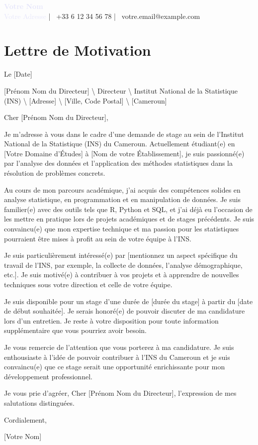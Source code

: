 \documentclass[
]{article}
\author{}
\date{\vspace{-2.5em}}
\begin{document}

\begin{center}
\textcolor{lavender}{\LARGE\textbf{Votre Nom}} \\
\textcolor{lavender}{Votre Adresse} | \faMobilePhone\ +33 6 12 34 56 78 | \faEnvelopeO\ votre.email@example.com \\
\end{center}

\hrulefill

\hypertarget{lettre-de-motivation}{%
\section{Lettre de Motivation}\label{lettre-de-motivation}}

Le {[}Date{]}

{[}Prénom Nom du Directeur{]} \textbackslash{} Directeur
\textbackslash{} Institut National de la Statistique (INS)
\textbackslash{} {[}Adresse{]} \textbackslash{} {[}Ville, Code Postal{]}
\textbackslash{} {[}Cameroun{]}

\hrulefill

Cher {[}Prénom Nom du Directeur{]},

Je m'adresse à vous dans le cadre d'une demande de stage au sein de
l'Institut National de la Statistique (INS) du Cameroun. Actuellement
étudiant(e) en {[}Votre Domaine d'Études{]} à {[}Nom de votre
Établissement{]}, je suis passionné(e) par l'analyse des données et
l'application des méthodes statistiques dans la résolution de problèmes
concrets.

Au cours de mon parcours académique, j'ai acquis des compétences solides
en analyse statistique, en programmation et en manipulation de données.
Je suis familier(e) avec des outils tels que R, Python et SQL, et j'ai
déjà eu l'occasion de les mettre en pratique lors de projets académiques
et de stages précédents. Je suis convaincu(e) que mon expertise
technique et ma passion pour les statistiques pourraient être mises à
profit au sein de votre équipe à l'INS.

Je suis particulièrement intéressé(e) par {[}mentionnez un aspect
spécifique du travail de l'INS, par exemple, la collecte de données,
l'analyse démographique, etc.{]}. Je suis motivé(e) à contribuer à vos
projets et à apprendre de nouvelles techniques sous votre direction et
celle de votre équipe.

Je suis disponible pour un stage d'une durée de {[}durée du stage{]} à
partir du {[}date de début souhaitée{]}. Je serais honoré(e) de pouvoir
discuter de ma candidature lors d'un entretien. Je reste à votre
disposition pour toute information supplémentaire que vous pourriez
avoir besoin.

Je vous remercie de l'attention que vous porterez à ma candidature. Je
suis enthousiaste à l'idée de pouvoir contribuer à l'INS du Cameroun et
je suis convaincu(e) que ce stage serait une opportunité enrichissante
pour mon développement professionnel.

Je vous prie d'agréer, Cher {[}Prénom Nom du Directeur{]}, l'expression
de mes salutations distinguées.

\bigskip

Cordialement,

{[}Votre Nom{]}
\end{document}
